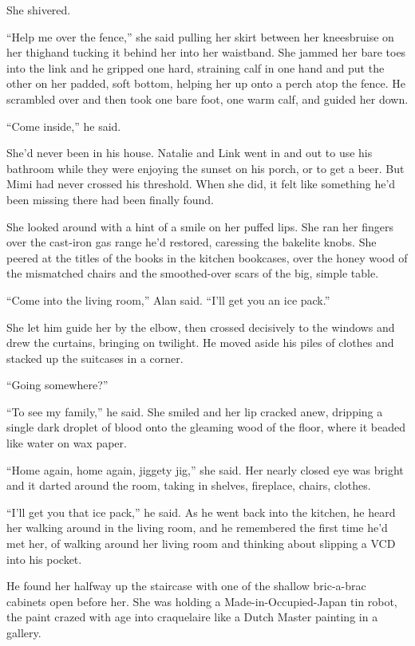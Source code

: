 She shivered.

``Help me over the fence,'' she said pulling her skirt between her
knees\dash{}bruise on her thigh\dash{}and tucking it behind her into her
waistband.  She jammed her bare toes into the link and he gripped one
hard, straining calf in one hand and put the other on her padded, soft
bottom, helping her up onto a perch atop the fence.  He scrambled over
and then took one bare foot, one warm calf, and guided her down.

``Come inside,'' he said.

She'd never been in his house.  Natalie and Link went in and out to
use his bathroom while they were enjoying the sunset on his porch, or
to get a beer.  But Mimi had never crossed his threshold.  When she
did, it felt like something he'd been missing there had been finally
found.

She looked around with a hint of a smile on her puffed lips.  She ran
her fingers over the cast-iron gas range he'd restored, caressing the
bakelite knobs.  She peered at the titles of the books in the kitchen
bookcases, over the honey wood of the mismatched chairs and the
smoothed-over scars of the big, simple table.

``Come into the living room,'' Alan said.  ``I'll get you an ice
pack.''

She let him guide her by the elbow, then crossed decisively to the
windows and drew the curtains, bringing on twilight.  He moved aside
his piles of clothes and stacked up the suitcases in a corner.

``Going somewhere?''

``To see my family,'' he said.  She smiled and her lip cracked anew,
dripping a single dark droplet of blood onto the gleaming wood of the
floor, where it beaded like water on wax paper.

``Home again, home again, jiggety jig,'' she said.  Her nearly closed
eye was bright and it darted around the room, taking in shelves,
fireplace, chairs, clothes.

``I'll get you that ice pack,'' he said.  As he went back into the
kitchen, he heard her walking around in the living room, and he
remembered the first time he'd met her, of walking around her living
room and thinking about slipping a VCD into his pocket.

He found her halfway up the staircase with one of the shallow
bric-a-brac cabinets open before her.  She was holding a
Made-in-Occupied-Japan tin robot, the paint crazed with age into
craquelaire like a Dutch Master painting in a gallery.

